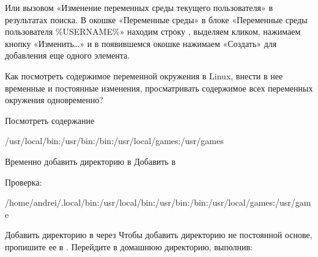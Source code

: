 \documentclass[letterpaper,10pt,russian]{sphinxmanual}
\begin{document}
\sphinxAtStartPar
{}

\sphinxAtStartPar
Или вызовом «Изменение переменных среды текущего пользователя» в результатах поиска.
В окошке «Переменные среды» в блоке «Переменные среды пользователя \%USERNAME\%» находим строку , выделяем кликом, нажимаем кнопку «Изменить…» и в появившемся окошке нажимаем «Создать» для добавления еще одного элемента.

\sphinxAtStartPar
Как посмотреть содержимое переменной окружения  в Linux, внести в нее временные и постоянные изменения, просматривать содержимое всех переменных окружения одновременно?

\sphinxAtStartPar
Посмотреть содержание 

\begin{sphinxVerbatim}[commandchars=\\\{\}]
/usr/local/bin:/usr/bin:/bin:/usr/local/games:/usr/games
\end{sphinxVerbatim}

\sphinxAtStartPar
Временно добавить директорию в 
Добавить  в 

\sphinxAtStartPar
{}

\sphinxAtStartPar
Проверка:

\begin{sphinxVerbatim}[commandchars=\\\{\}]
/home/andrei/.local/bin:/usr/local/bin:/usr/bin:/bin:/usr/local/games:/usr/game
\end{sphinxVerbatim}

\sphinxAtStartPar
Добавить директорию в  через 
Чтобы добавить директорию не постоянной основе, пропишите ее в .
Перейдите в домашнюю директорию, выполнив:

\begin{sphinxVerbatim}[commandchars=\\\{\}]
\PYGZti{}
\end{sphinxVerbatim}
\end{document}
